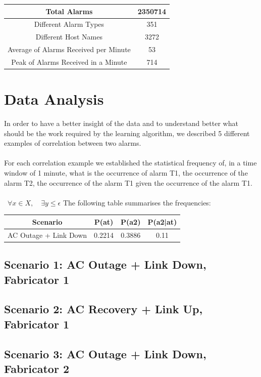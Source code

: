 \documentclass[10pt,a4paper]{report}
\begin{document}
\begin{center}
 \begin{tabular}{||c | c ||} 
 \hline\hline
 Total Alarms  & 2350714 \\ 
 \hline
 Different Alarm Types & 351 \\ 
 \hline
 Different Host Names & 3272 \\
  \hline
 Average of Alarms Received per Minute & 53 \\
 \hline
 Peak of Alarms Received in a Minute & 714 \\
 \hline\hline
\end{tabular}
\end{center}

\section{Data Analysis} 
In order to have a better insight of the data and to understand better what should be the work required by the learning algorithm, we described 5 different examples of correlation between two alarms.
\\\\
For each correlation example we established the statistical frequency of, in a time window of 1 minute, what is the occurrence of alarm T1, the occurrence of the alarm T2, the occurrence of the alarm T1 given the occurrence of the alarm T1.
\\\\\
\(\forall x \in X, \quad \exists y \leq \epsilon\)
The following table summarises the frequencies:

\begin{center}
 \begin{tabular}{||c | c | c | c ||} 
 \hline\hline
 Scenario  & P(at) & P(a2) & P(a2|at) \\ 
 \hline
 AC Outage + Link Down & 0.2214 & 0.3886 & 0.11 \\ 
 \hline\hline
\end{tabular}
\end{center}

\subsection{Scenario 1: AC Outage + Link Down, Fabricator 1} 
\subsection{Scenario 2: AC Recovery + Link Up, Fabricator 1} 
\subsection{Scenario 3: AC Outage + Link Down, Fabricator 2} 
\end{document}
